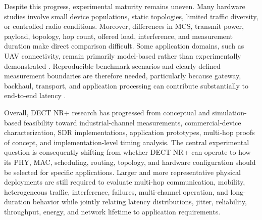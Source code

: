 Despite this progress, experimental maturity remains uneven. Many hardware studies involve small device populations, static topologies, limited traffic diversity, or controlled radio conditions. Moreover, differences in MCS, transmit power, payload, topology, hop count, offered load, interference, and measurement duration make direct comparison difficult. Some application domains, such as UAV connectivity, remain primarily model-based rather than experimentally demonstrated \cite{jahangirAnalysisPerformanceDECT2024}. Reproducible benchmark scenarios and clearly defined measurement boundaries are therefore needed, particularly because gateway, backhaul, transport, and application processing can contribute substantially to end-to-end latency \cite{piresDECT2020NREnergy2026b}.

Overall, DECT NR+ research has progressed from conceptual and simulation-based feasibility toward industrial-channel measurements, commercial-device characterization, SDR implementations, application prototypes, multi-hop proofs of concept, and implementation-level timing analysis. The central experimental question is consequently shifting from whether DECT NR+ can operate to how its PHY, MAC, scheduling, routing, topology, and hardware configuration should be selected for specific applications. Larger and more representative physical deployments are still required to evaluate multi-hop communication, mobility, heterogeneous traffic, interference, failures, multi-channel operation, and long-duration behavior while jointly relating latency distributions, jitter, reliability, throughput, energy, and network lifetime to application requirements.